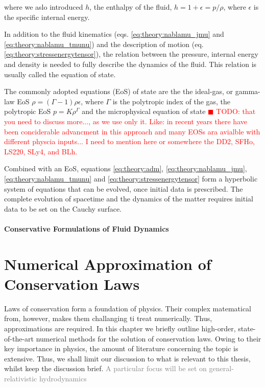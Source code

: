 \documentclass[11pt,a4paper,headinclude=true,DIV=14,BCOR=8mm,chapterprefix,listof=totoc,twoside,openright,abstracton]{scrbook}
\newcommand{\todo}[1]{\textcolor{red}{$\blacksquare$ TODO: #1}}
\newcommand{\gray}[1]{\textcolor{gray}{#1}}
\begin{document}
where we aslo introduced $h$, the enthalpy of the fluid, $h = 1 + \epsilon = p/\rho$, where $\epsilon$ is the specific internal energy. 

In addition to the fluid kinematics (eqs. \ref{eq:theory:nablamu_jmu} and \ref{eq:theory:nablamu_tmunu}) and the description of motion (eq. \ref{eq:theory:stressenergytensor}), the relation between the pressure, internal energy and density is needed to fully describe the dynamics of the fluid. This relation is usually called the equation of state. 

The commonly adopted equations (EoS) of state are the the ideal-gas, or gamma-law EoS $\rho = (\Gamma-1)\rho\epsilon$, where $\Gamma$ is the polytropic index of the gas, the polytropic EoS $p = K\rho^{\Gamma}$ and the microphysical equation of state \todo{that you need to discuss more..., as we use only it. Like: in recent years there have been conciderable advancment in this approach and many EOSs ara avialble with different physcia inputs... I need to mention here or somewhere the DD2, SFHo, LS220, SLy4, and BLh.}

Combined with an EoS, equations \ref{eq:theory:adm}, \ref{eq:theory:nablamu_jmu}, \ref{eq:theory:nablamu_tmunu} and \ref{eq:theory:stressenergytensor} form a hyperbolic
system of equations that can be evolved, once initial data is prescribed. The complete evolution of spacetime and the dynamics of the matter requires initial data to be set on the Cauchy surface.


\subsubsection{Conservative Formulations of Fluid Dynamics}






\chapter{Numerical Approximation of Conservation Laws}
\label{ch:nummethods}

Laws of conservation form a foundation of physics. Their complex matematical from, however, makes them challanging ti treat numerically. Thus, approximations are required. In this chapter we briefly outline high-order, state-of-the-art numerical methods for the solution of conservation laws. Owing to their key importance in physics, the amount of literature concerning the topic is extensive. Thus, we shall limit our discussion to what is relevant to this thesis, whilst keep the discussion brief. \gray{A particular focus will be set on general-relativistic hydrodynamics} \\
\end{document}
